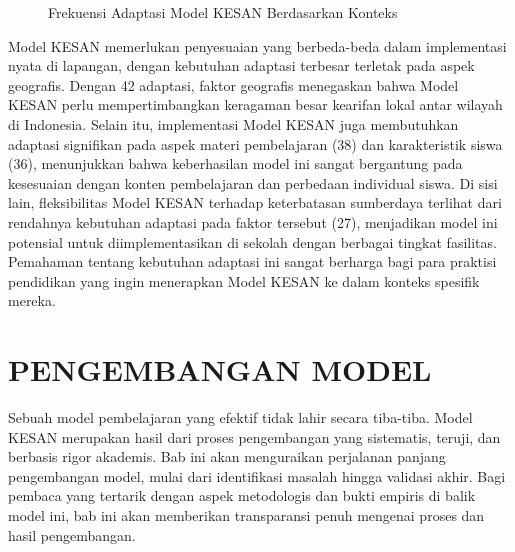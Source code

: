 \documentclass[12pt,a4paper,oneside]{book}
\begin{document}
\begin{figure}[H]
  \centering
  \caption{Frekuensi Adaptasi Model KESAN Berdasarkan Konteks}
  \label{fig:adaptasi_freq}
\end{figure}

Model KESAN memerlukan penyesuaian yang berbeda-beda dalam implementasi nyata di lapangan, dengan kebutuhan adaptasi terbesar terletak pada aspek geografis. Dengan 42 adaptasi, faktor geografis menegaskan bahwa Model KESAN perlu mempertimbangkan keragaman besar kearifan lokal antar wilayah di Indonesia. Selain itu, implementasi Model KESAN juga membutuhkan adaptasi signifikan pada aspek materi pembelajaran (38) dan karakteristik siswa (36), menunjukkan bahwa keberhasilan model ini sangat bergantung pada kesesuaian dengan konten pembelajaran dan perbedaan individual siswa. Di sisi lain, fleksibilitas Model KESAN terhadap keterbatasan sumberdaya terlihat dari rendahnya kebutuhan adaptasi pada faktor tersebut (27), menjadikan model ini potensial untuk diimplementasikan di sekolah dengan berbagai tingkat fasilitas. Pemahaman tentang kebutuhan adaptasi ini sangat berharga bagi para praktisi pendidikan yang ingin menerapkan Model KESAN ke dalam konteks spesifik mereka.

\chapter{PENGEMBANGAN MODEL}

Sebuah model pembelajaran yang efektif tidak lahir secara tiba-tiba. Model KESAN merupakan hasil dari proses pengembangan yang sistematis, teruji, dan berbasis rigor akademis. Bab ini akan menguraikan perjalanan panjang pengembangan model, mulai dari identifikasi masalah hingga validasi akhir. Bagi pembaca yang tertarik dengan aspek metodologis dan bukti empiris di balik model ini, bab ini akan memberikan transparansi penuh mengenai proses dan hasil pengembangan.
\end{document}
